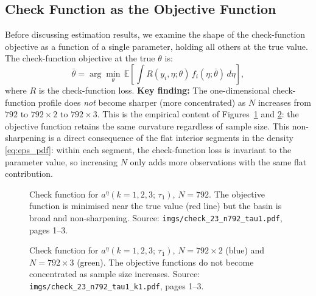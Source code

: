 \documentclass[12pt]{article}
\begin{document}
\subsection{Check Function as the Objective Function}

Before discussing estimation results, we examine the shape of the check-function
objective as a function of a single parameter, holding all others at the true
value.
The check-function objective at the true $\theta$ is:
\begin{equation}
\bar\theta=\arg\min_\theta\,\mathbb{E}\!\left[
\int R(y_i,\eta;\theta)\,f_i(\eta;\bar\theta)\,d\eta\right],
\end{equation}
where $R$ is the check-function loss.
\textbf{Key finding:} The one-dimensional check-function profile does \emph{not}
become sharper (more concentrated) as $N$ increases from $792$ to $792\times2$
to $792\times3$.
This is the empirical content of Figures~\ref{fig:check_N792} and
\ref{fig:check_N2_3}: the objective function retains the same curvature
regardless of sample size.
This non-sharpening is a direct consequence of the flat interior segments in
the density \eqref{eq:eps_pdf}: within each segment, the check-function
loss is invariant to the parameter value, so increasing $N$ only adds more
observations with the same flat contribution.

\begin{figure}[H]
\centering
\caption{Check function for $a^\eta(k=1,2,3;\,\tau_1)$, $N=792$.
The objective function is minimised near the true value (red line)
but the basin is broad and non-sharpening.
Source: \texttt{imgs/check\_23\_n792\_tau1.pdf}, pages 1--3.}
\label{fig:check_N792}
\end{figure}

\begin{figure}[H]
\centering
\caption{Check function for $a^\eta(k=1,2,3;\,\tau_1)$, $N=792\times2$ (blue) and $N=792\times3$ (green).
The objective functions do not become concentrated as sample size increases.
Source: \texttt{imgs/check\_23\_n792\_tau1\_k1.pdf}, pages 1--3.}
\label{fig:check_N2_3}
\end{figure}
\end{document}
